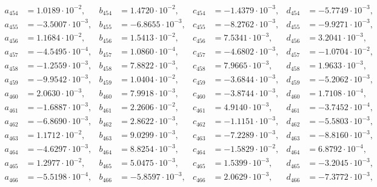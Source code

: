 \begin{align*}
  a_{ 454 } &= 1.0189 \cdot 10^{ -2 }, & b_{ 454 } &= 1.4720 \cdot 10^{ -2 }, & c_{ 454 } &= -1.4379 \cdot 10^{ -3 }, & d_{ 454 } &= -5.7749 \cdot 10^{ -3 }, \\ 
  a_{ 455 } &= -3.5007 \cdot 10^{ -3 }, & b_{ 455 } &= -6.8655 \cdot 10^{ -3 }, & c_{ 455 } &= -8.2762 \cdot 10^{ -3 }, & d_{ 455 } &= -9.9271 \cdot 10^{ -3 }, \\ 
  a_{ 456 } &= 1.1684 \cdot 10^{ -2 }, & b_{ 456 } &= 1.5413 \cdot 10^{ -2 }, & c_{ 456 } &= 7.5341 \cdot 10^{ -3 }, & d_{ 456 } &= 3.2041 \cdot 10^{ -3 }, \\ 
  a_{ 457 } &= -4.5495 \cdot 10^{ -4 }, & b_{ 457 } &= 1.0860 \cdot 10^{ -4 }, & c_{ 457 } &= -4.6802 \cdot 10^{ -3 }, & d_{ 457 } &= -1.0704 \cdot 10^{ -2 }, \\ 
  a_{ 458 } &= -1.2559 \cdot 10^{ -3 }, & b_{ 458 } &= 7.8822 \cdot 10^{ -3 }, & c_{ 458 } &= 7.9665 \cdot 10^{ -3 }, & d_{ 458 } &= 1.9633 \cdot 10^{ -3 }, \\ 
  a_{ 459 } &= -9.9542 \cdot 10^{ -3 }, & b_{ 459 } &= 1.0404 \cdot 10^{ -2 }, & c_{ 459 } &= -3.6844 \cdot 10^{ -3 }, & d_{ 459 } &= -5.2062 \cdot 10^{ -3 }, \\ 
  a_{ 460 } &= 2.0630 \cdot 10^{ -3 }, & b_{ 460 } &= 7.9918 \cdot 10^{ -3 }, & c_{ 460 } &= -3.8744 \cdot 10^{ -3 }, & d_{ 460 } &= 1.7108 \cdot 10^{ -4 }, \\ 
  a_{ 461 } &= -1.6887 \cdot 10^{ -3 }, & b_{ 461 } &= 2.2606 \cdot 10^{ -2 }, & c_{ 461 } &= 4.9140 \cdot 10^{ -3 }, & d_{ 461 } &= -3.7452 \cdot 10^{ -4 }, \\ 
  a_{ 462 } &= -6.8690 \cdot 10^{ -3 }, & b_{ 462 } &= 2.8622 \cdot 10^{ -3 }, & c_{ 462 } &= -1.1151 \cdot 10^{ -3 }, & d_{ 462 } &= -5.5803 \cdot 10^{ -3 }, \\ 
  a_{ 463 } &= 1.1712 \cdot 10^{ -2 }, & b_{ 463 } &= 9.0299 \cdot 10^{ -3 }, & c_{ 463 } &= -7.2289 \cdot 10^{ -3 }, & d_{ 463 } &= -8.8160 \cdot 10^{ -3 }, \\ 
  a_{ 464 } &= -4.6297 \cdot 10^{ -3 }, & b_{ 464 } &= 8.8254 \cdot 10^{ -3 }, & c_{ 464 } &= -1.5829 \cdot 10^{ -2 }, & d_{ 464 } &= 6.8792 \cdot 10^{ -4 }, \\ 
  a_{ 465 } &= 1.2977 \cdot 10^{ -2 }, & b_{ 465 } &= 5.0475 \cdot 10^{ -3 }, & c_{ 465 } &= 1.5399 \cdot 10^{ -3 }, & d_{ 465 } &= -3.2045 \cdot 10^{ -3 }, \\ 
  a_{ 466 } &= -5.5198 \cdot 10^{ -4 }, & b_{ 466 } &= -5.8597 \cdot 10^{ -3 }, & c_{ 466 } &= 2.0629 \cdot 10^{ -3 }, & d_{ 466 } &= -7.3772 \cdot 10^{ -3 }, \\ 

\end{align*}
